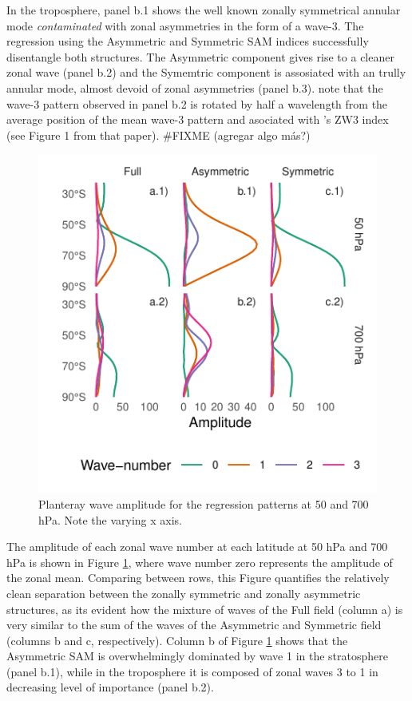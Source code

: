 \documentclass[]{ametsocV5}
\begin{document}
In the troposphere, panel b.1 shows the well known zonally symmetrical
annular mode \emph{contaminated} with zonal asymmetries in the form of a
wave-3. The regression using the Asymmetric and Symmetric SAM indices
successfully disentangle both structures. The Asymmetric component gives
rise to a cleaner zonal wave (panel b.2) and the Symemtric component is
assosiated with an trully annular mode, almost devoid of zonal
asymmetries (panel b.3). note that the wave-3 pattern observed in panel
b.2 is rotated by half a wavelength from the average position of the
mean wave-3 pattern and asociated with \citet{raphael2004}'s ZW3 index
(see Figure 1 from that paper). \#FIXME (agregar algo más?)

\begin{figure}
\includegraphics{wave-amplitude-1} \caption[Planteray wave amplitude for the regression patterns at 50 and 700 hPa]{Planteray wave amplitude for the regression patterns at 50 and 700 hPa. Note the varying x axis.}\label{fig:wave-amplitude}
\end{figure}

The amplitude of each zonal wave number at each latitude at 50 hPa and
700 hPa is shown in Figure \ref{fig:wave-amplitude}, where wave number
zero represents the amplitude of the zonal mean. Comparing between rows,
this Figure quantifies the relatively clean separation between the
zonally symmetric and zonally asymmetric structures, as its evident how
the mixture of waves of the Full field (column a) is very similar to the
sum of the waves of the Asymmetric and Symmetric field (columns b and c,
respectively). Column b of Figure \ref{fig:wave-amplitude} shows that
the Asymmetric SAM is overwhelmingly dominated by wave 1 in the
stratosphere (panel b.1), while in the troposphere it is composed of
zonal waves 3 to 1 in decreasing level of importance (panel b.2).
\end{document}
